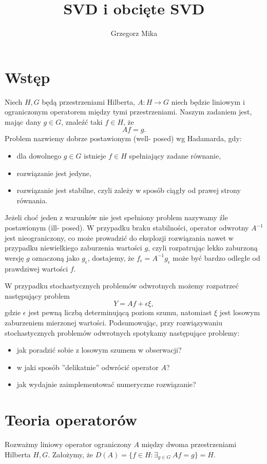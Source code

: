 \documentclass[12pt]{article}
\title{SVD i obcięte SVD}
\author{Grzegorz Mika}
\begin{document}
\maketitle
\section{Wstęp}
Niech $H,G$ będą przestrzeniami Hilberta, $A\colon H \to G$ niech będzie liniowym i ograniczonym operatorem między tymi przestrzeniami. Naszym zadaniem jest, mając dany $g\in G$, znaleźć taki $f\in H$, że
\begin{displaymath}
Af=g.
\end{displaymath}
Problem nazwiemy dobrze postawionym (well- posed) wg Hadamarda, gdy:
\begin{itemize}
\item dla dowolnego $g\in G$ istnieje $f\in H$ spełniający zadane równanie,
\item rozwiązanie jest jedyne,
\item rozwiązanie jest stabilne, czyli zależy w sposób ciągły od prawej strony równania.
\end{itemize}
Jeżeli choć jeden z warunków nie jest spełniony problem nazywamy źle postawionym (ill- posed). W przypadku braku stabilności, operator odwrotny $A^{-1}$ jest nieograniczony, co może prowadzić do eksplozji rozwiązania nawet w przypadku niewielkiego zaburzenia wartości $g$, czyli rozpatrując lekko zaburzoną wersję $g$ oznaczoną jako $g_{\epsilon}$, dostajemy, że $f_{\epsilon}=A^{-1}g_{\epsilon}$ może być bardzo odległe od prawdziwej wartości $f$.

W przypadku stochastycznych problemów odwrotnych możemy rozpatrzeć następujący problem
\begin{displaymath}
Y=Af+\epsilon \xi,
\end{displaymath}
gdzie $\epsilon$ jest pewną liczbą determinującą poziom szumu, natomiast $\xi$ jest losowym zaburzeniem mierzonej wartości.
Podsumowując, przy rozwiązywaniu stochastycznych problemów odwrotnych spotykamy następujące problemy:
\begin{itemize}
\item  jak poradzić sobie z losowym szumem w obserwacji?
\item w jaki sposób ''delikatnie'' odwrócić operator $A$?
\item jak wydajnie zaimplementować numeryczne rozwiązanie?
\end{itemize}


\section{Teoria operatorów}
Rozważmy liniowy operator ograniczony $A$ między dwoma przestrzeniami Hilberta $H,G$. Założymy, że $D(A)=\{f\in H\colon \exists_{g\in G}\ Af=g\}=H$.
\end{document}
